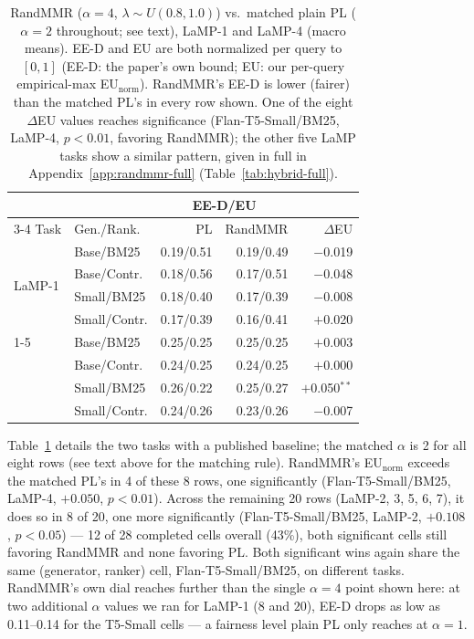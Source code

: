 \documentclass[10pt,twocolumn]{article}
\begin{document}
\begin{table}[t]
\centering
\scriptsize
\setlength{\tabcolsep}{3pt}
\caption{RandMMR ($\alpha{=}4$, $\lambda\sim U(0.8,1.0)$) vs.\ matched plain PL
($\alpha{=}2$ throughout; see text), LaMP-1 and LaMP-4 (macro means). EE-D and EU
are both normalized per query to $[0,1]$ (EE-D: the paper's own bound; EU: our
per-query empirical-max EU$_{\text{norm}}$). RandMMR's EE-D is lower (fairer) than
the matched PL's in every row shown. One of the eight $\Delta$EU values reaches
significance (Flan-T5-Small/BM25, LaMP-4, $p{<}0.01$, favoring RandMMR); the other
five LaMP tasks show a similar pattern, given in full in
Appendix~\ref{app:randmmr-full} (Table~\ref{tab:hybrid-full}).}
\label{tab:hybrid}
\begin{tabular}{@{}ll rr r@{}}
\toprule
& & \multicolumn{2}{c}{EE-D/EU} & \\
\cmidrule(lr){3-4}
Task & Gen./Rank. & PL & RandMMR & $\Delta$EU \\
\midrule
\multirow{4}{*}{LaMP-1} & Base/BM25    & 0.19/0.51 & 0.19/0.49 & $-$0.019 \\
 & Base/Contr.  & 0.18/0.56 & 0.17/0.51 & $-$0.048 \\
 & Small/BM25   & 0.18/0.40 & 0.17/0.39 & $-$0.008 \\
 & Small/Contr. & 0.17/0.39 & 0.16/0.41 & $+$0.020 \\
\cmidrule(lr){1-5}
\multirow{4}{*}{LaMP-4} & Base/BM25    & 0.25/0.25 & 0.25/0.25 & $+$0.003 \\
 & Base/Contr.  & 0.24/0.25 & 0.24/0.25 & $+$0.000 \\
 & Small/BM25   & 0.26/0.22 & 0.25/0.27 & $+$0.050$^{**}$ \\
 & Small/Contr. & 0.24/0.26 & 0.23/0.26 & $-$0.007 \\
\bottomrule
\end{tabular}
\end{table}

Table~\ref{tab:hybrid} details the two tasks with a published baseline; the matched
$\alpha$ is 2 for all eight rows (see text above for the matching rule). RandMMR's
EU$_{\text{norm}}$ exceeds the matched PL's in 4 of these 8 rows, one significantly
(Flan-T5-Small/BM25, LaMP-4, $+0.050$, $p{<}0.01$). Across the remaining 20 rows
(LaMP-2, 3, 5, 6, 7), it does so in 8 of 20, one more significantly
(Flan-T5-Small/BM25, LaMP-2, $+0.108$, $p{<}0.05$) --- 12 of 28 completed cells
overall (43\%), both significant cells still favoring RandMMR and none favoring PL.
Both significant wins again share the same (generator, ranker) cell,
Flan-T5-Small/BM25, on different tasks. RandMMR's own dial reaches further than the
single $\alpha{=}4$ point shown here: at two additional $\alpha$ values we ran for
LaMP-1 ($8$ and $20$), EE-D drops as low as 0.11--0.14 for the T5-Small cells ---
a fairness level plain PL only reaches at $\alpha{=}1$.
\end{document}
